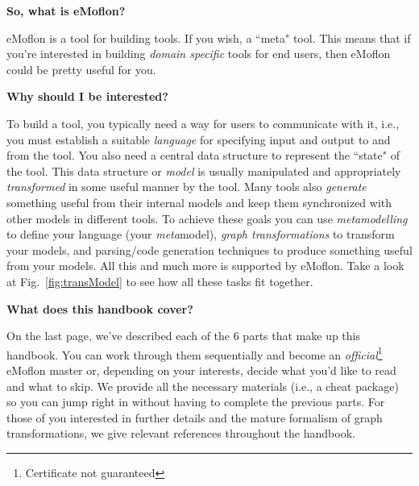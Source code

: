 {\bf \large So, what is eMoflon?}

eMoflon is a tool for building tools. If you wish, a ``meta" tool.  This means that if you're interested in building \emph{domain specific} tools for end users,
then eMoflon could be pretty useful for you.


{\bf \large Why should I be interested?}

To build a tool, you typically need a way for users to communicate with it, i.e., you must establish a suitable \emph{language} for specifying input and output
to and from the tool.  You also need a central data structure to represent the ``state" of the tool.  This data structure or \emph{model} is usually manipulated
and appropriately \emph{transformed} in some useful manner by the tool.  Many tools also \emph{generate} something useful from their internal models and keep
them synchronized with other models in different tools. To achieve these goals you can use \emph{metamodelling} to define your language (your \emph{meta}model),
\emph{graph transformations} to transform your models, and parsing/code generation techniques to produce something useful from your models. All this and much
more is supported by eMoflon. Take a look at Fig.~\ref{fig:transModel} to see how all these tasks fit together.

{\bf \large What does this handbook cover?}

On the last page, we've described each of the 6 parts that make up this handbook. You can work through them sequentially and become an
\emph{official}\footnote{Certificate not guaranteed} eMoflon master or, depending on your interests, decide what you'd like to read and what to skip. We
provide all the necessary materials (i.e., a cheat package) so you can jump right in without having to complete the previous parts. For those of you interested
in further details and the mature formalism of graph transformations, we give relevant references throughout the handbook.

\vfill \newpage

